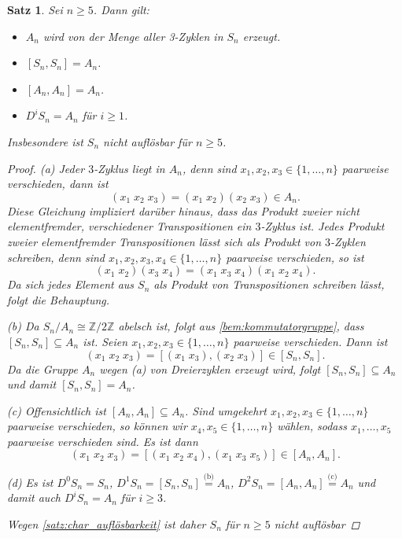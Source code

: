 \documentclass[a4paper, twoside, 11pt, ngerman]{report}
\theoremstyle{definistyle}
\newtheorem{satz}{Satz}[section]
\theoremstyle{remark}
\begin{document}
\begin{satz}\label{satz:sn_nicht_aufl}
Sei $n \geq 5$. Dann gilt:
\begin{itemize}
\item[(a)] $A_n$ wird von der Menge aller 3-Zyklen in $S_n$ erzeugt.
\item[(b)] $[S_n, S_n] = A_n$.
\item[(c)] $[A_n, A_n] = A_n$.
\item[(d)] $D^i S_n = A_n$ für $i \geq 1$.
\end{itemize}
Insbesondere ist $S_n$ nicht auflösbar für $n \geq 5$.
\begin{proof}
(a) Jeder $3$-Zyklus liegt in $A_n$, denn sind $x_1, x_2, x_3 \in \{1, \dots, n\}$ paarweise verschieden, dann ist
\[
(x_1 \; x_2 \; x_3) = (x_1 \; x_2)(x_2 \; x_3) \in A_n.
\]
Diese Gleichung impliziert darüber hinaus, dass das Produkt zweier nicht elementfremder, verschiedener Transpositionen
ein $3$-Zyklus ist. Jedes Produkt zweier elementfremder Transpositionen lässt sich als Produkt von $3$-Zyklen schreiben, denn sind $x_1, x_2, x_3, x_4 \in \{1, \dots, n\}$ paarweise verschieden, so ist
\[
(x_1 \; x_2)(x_3 \; x_4) = (x_1 \; x_3 \; x_4)(x_1 \; x_2 \; x_4).
\]
Da sich jedes Element aus $S_n$ als Produkt von Transpositionen schreiben lässt, folgt die Behauptung.

(b) Da $S_n/A_n \cong \mathbb{Z}/2\mathbb{Z}$ abelsch ist, folgt aus \ref{bem:kommutatorgruppe}, dass $[S_n, S_n] \subseteq A_n$ ist. Seien $x_1, x_2, x_3 \in \{1, \dots, n\}$ paarweise verschieden. Dann ist
\[
(x_1 \; x_2 \; x_3) = [(x_1 \; x_3), (x_2 \; x_3)]\in [S_n, S_n].
\]
Da die Gruppe $A_n$ wegen (a) von Dreierzyklen erzeugt wird, folgt $[S_n, S_n] \subseteq A_n$ und damit $[S_n, S_n] = A_n$.

(c) Offensichtlich ist $[A_n, A_n] \subseteq A_n$. Sind umgekehrt $x_1,x_2,x_3\in \{1, \dots, n\}$ paarweise verschieden,
so können wir $x_4,x_5\in\{1,\ldots,n\}$ wählen, sodass $x_1,\ldots,x_5$ paarweise verschieden sind.
Es ist dann
\[
(x_1 \; x_2 \; x_3) = [(x_1 \; x_2 \; x_4),(x_1 \; x_3 \; x_5)]\in[A_n,A_n].
\]

(d) Es ist $D^0S_n=S_n$, $D^1S_n=[S_n,S_n]\overset{\text{(b)}}{=}A_n$, $D^2S_n=[A_n,A_n]\overset{\text{(c)}}{=}A_n$
und damit auch $D^iS_n=A_n$ für $i\geq3$.

Wegen \ref{satz:char_auflösbarkeit} ist daher $S_n$ für $n\geq 5$ nicht auflösbar
\end{proof}
\end{satz}
\end{document}
